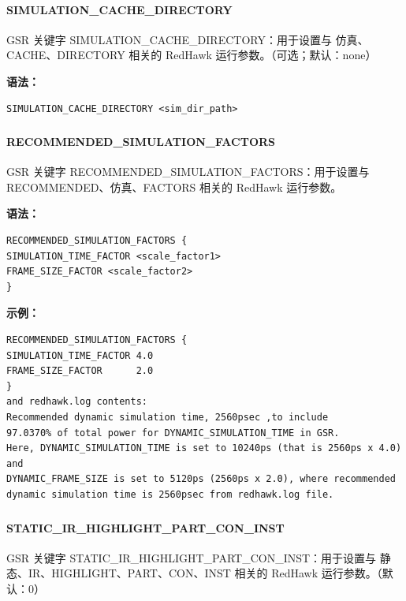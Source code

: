 \paragraph*{SIMULATION_CACHE_DIRECTORY}

GSR 关键字 SIMULATION_CACHE_DIRECTORY：用于设置与 仿真、CACHE、DIRECTORY 相关的 RedHawk 运行参数。（可选；默认：none）

\textbf{语法：}
\begin{lstlisting}
SIMULATION_CACHE_DIRECTORY <sim_dir_path>
\end{lstlisting}

\subsubsection{}
\paragraph*{RECOMMENDED_SIMULATION_FACTORS}

GSR 关键字 RECOMMENDED_SIMULATION_FACTORS：用于设置与 RECOMMENDED、仿真、FACTORS 相关的 RedHawk 运行参数。

\textbf{语法：}
\begin{lstlisting}
RECOMMENDED_SIMULATION_FACTORS {
SIMULATION_TIME_FACTOR <scale_factor1>
FRAME_SIZE_FACTOR <scale_factor2>
}
\end{lstlisting}

\textbf{示例：}
\begin{lstlisting}
RECOMMENDED_SIMULATION_FACTORS {
SIMULATION_TIME_FACTOR 4.0
FRAME_SIZE_FACTOR      2.0
}
and redhawk.log contents:
Recommended dynamic simulation time, 2560psec ,to include
97.0370% of total power for DYNAMIC_SIMULATION_TIME in GSR.
Here, DYNAMIC_SIMULATION_TIME is set to 10240ps (that is 2560ps x 4.0) and
DYNAMIC_FRAME_SIZE is set to 5120ps (2560ps x 2.0), where recommended
dynamic simulation time is 2560psec from redhawk.log file.
\end{lstlisting}

\subsubsection{}
\paragraph*{STATIC_IR_HIGHLIGHT_PART_CON_INST}

GSR 关键字 STATIC_IR_HIGHLIGHT_PART_CON_INST：用于设置与 静态、IR、HIGHLIGHT、PART、CON、INST 相关的 RedHawk 运行参数。（默认：0）

